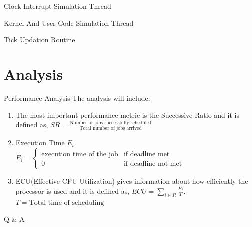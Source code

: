 ﻿\documentclass{beamer}
\begin{document}
\begin{frame}{Clock Interrupt Simulation Thread}
    
\end{frame}

\begin{frame}{Kernel And User Code Simulation Thread}
  
\end{frame}

\begin{frame}{Tick Updation Routine}
  
\end{frame}

\section{Analysis}
\begin{frame}{Performance Analysis}
  The analysis will include:\pause
  \begin{enumerate}
  \item The most important performance metric is the Successive Ratio and it is defined as, $SR = \frac{\text{Number of jobs successfully scheduled}}{\text{Total number of jobs arrived}}$ \pause
  \item Execution Time $E_i$.\\\pause
    $
    E_i=  
    \begin{cases}
      \mbox{execution time of the job}   &\mbox{if deadline met}\\
      0 &\mbox{if deadline not met} 
    \end{cases}
    $
  \item ECU(Effective CPU Utilization) gives information about how efficiently the processor is used and it is defined as, $ECU=\sum_{i\in R} \frac{E_i}{T}$. $T=\text{Total time of scheduling}$
  \end{enumerate}
\end{frame}


\begin{frame}
  \begin{center}
    \Huge{Q \& A}
  \end{center}
\end{frame}  
\end{document}
